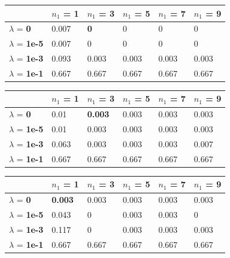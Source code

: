 \documentclass[10pt]{article}
\begin{document}
\begin{table}
\centering
\begin{tabular}{llllll}
\toprule
& $n_1$ = \bf{1} & $n_1$ =  \bf{3} & $n_1$ =  \bf{5} & $n_1$ =  \bf{7} & $n_1$ =  \bf{9} \\
\midrule
$\lambda$ = \bf{0} &  0.007 & \bf{0}     & 0     & 0     & 0     \\
$\lambda$ = \bf{1e-5} & 0.007 & 0     & 0     & 0     & 0     \\
$\lambda$ = \bf{1e-3} & 0.093 & 0.003 & 0.003 & 0.003 & 0.003 \\
$\lambda$ = \bf{1e-1} & 0.667 & 0.667 & 0.667 & 0.667 & 0.667 \\
\bottomrule
\end{tabular}
\end{table}

\begin{table}
\centering
\begin{tabular}{llllll}
\toprule
& $n_1$ = \bf{1} & $n_1$ =  \bf{3} & $n_1$ =  \bf{5} & $n_1$ =  \bf{7} & $n_1$ =  \bf{9} \\
\midrule
$\lambda$ = \bf{0} &      0.01  & \bf{0.003} & 0.003 & 0.003 & 0.003 \\
$\lambda$ = \bf{1e-5} &  0.01  & 0.003 & 0.003 & 0.003 & 0.003 \\
$\lambda$ = \bf{1e-3} &  0.063 & 0.003 & 0.003 & 0.003 & 0.007 \\
$\lambda$ = \bf{1e-1} &  0.667 & 0.667 & 0.667 & 0.667 & 0.667 \\
\bottomrule
\end{tabular}
\end{table}

\begin{table}
\centering
\begin{tabular}{llllll}
\toprule
& $n_1$ = \bf{1} & $n_1$ =  \bf{3} & $n_1$ =  \bf{5} & $n_1$ =  \bf{7} & $n_1$ =  \bf{9} \\
\midrule
$\lambda$ = \bf{0} &       \bf{0.003} & 0.003 & 0.003 & 0.003 & 0.003 \\
$\lambda$ = \bf{1e-5} &   0.043 & 0     & 0.003 & 0.003 & 0     \\
$\lambda$ = \bf{1e-3} &   0.117 & 0     & 0.003 & 0.003 & 0.003 \\
$\lambda$ = \bf{1e-1} &   0.667 & 0.667 & 0.667 & 0.667 & 0.667 \\
\bottomrule
\end{tabular}
\end{table}
	
\end{document}
